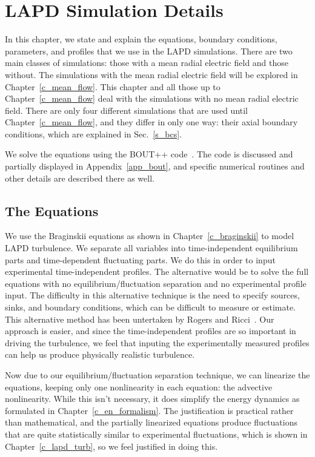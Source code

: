 \chapter{LAPD Simulation Details}
\label{c_lapd_sim}

In this chapter, we state and explain the equations, boundary conditions, parameters, and profiles that we use in the LAPD simulations. 
There are two main classes of simulations: those with a mean radial electric field and those without. The simulations
with the mean radial electric field will be explored in Chapter~\ref{c_mean_flow}. This chapter and all those up to Chapter~\ref{c_mean_flow} deal
with the simulations with no mean radial electric field. There are only four different
simulations that are used until Chapter~\ref{c_mean_flow}, and they differ in only one way: their axial boundary conditions, which are explained in Sec.~\ref{s_bcs}.

We solve the equations using the BOUT++ code~\cite{dudson2009}. The code is discussed and partially displayed in Appendix~\ref{app_bout}, 
and specific numerical routines and other details are described there as well.

\section{The Equations}
\label{s_equations}

We use the Braginskii equations as shown in Chapter~\ref{c_braginskii} to model LAPD turbulence. We separate all variables into time-independent equilibrium parts and time-dependent
fluctuating parts.  We do this in order to input experimental time-independent profiles. The alternative would be to solve the full equations with no equilibrium/fluctuation separation
and no experimental profile input. The difficulty in this alternative technique is the need to specify sources, sinks, and boundary conditions, which can be difficult to measure or estimate.
This alternative method has been untertaken by Rogers and Ricci~\cite{rogers2010}. Our approach is easier, and since the time-independent profiles are so important in driving the turbulence,
we feel that inputing the experimentally measured profiles can help us produce physically realistic turbulence.

Now due to our equilibrium/fluctuation separation technique, we can linearize the equations, keeping only one nonlinearity in each equation: the
advective nonlinearity. While this isn't necessary, it does simplify the energy dynamics as formulated in Chapter~\ref{c_en_formalism}. The justification is practical rather than mathematical,
and the partially linearized equations produce fluctuations that are quite statistically similar to experimental fluctuations, which is shown in Chapter~\ref{c_lapd_turb}, so we feel justified
in doing this.

